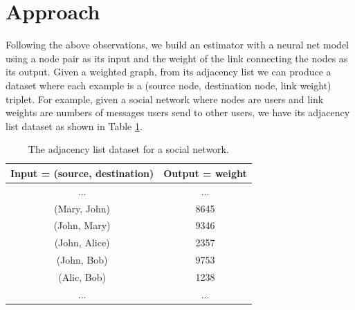 \documentclass[book,12pt]{WSUThesis}
\theoremstyle{definition}
\begin{document}
\section{Approach}
Following the above observations,
we build an estimator with a neural net model using a node pair as its input
and the weight of the link connecting the nodes as its output.
Given a weighted graph, from its adjacency list we can produce a dataset where each example is a (source node, destination node, link weight) triplet.
For example, given a social network where nodes are users and link weights are numbers of messages users send to other users, we have its adjacency list dataset as shown in Table \ref{tab:link-list-dataset}.
\begin{table}[!ht]
	\centering
	\caption{The adjacency list dataset for a social network.}
	\begin{tabular}{cc}  \hline \rowcolor{blue!30}
		Input = (source, destination) & Output = weight \\ \hline
		...                        & ... \\ \hline
		(Mary, John) & 8645 \\ \hline
		(John, Mary) & 9346 \\ \hline
		(John, Alice) & 2357 \\ \hline
		(John, Bob) & 9753 \\ \hline
		(Alic, Bob) & 1238 \\ \hline
		...                        & ... \\ \hline
	\end{tabular}
	\label{tab:link-list-dataset}
\end{table}
\end{document}
